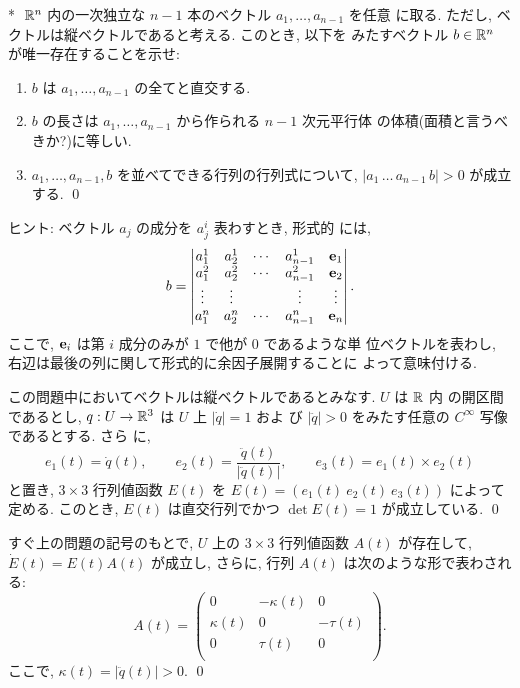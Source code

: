 \documentclass[12pt,twoside]{jarticle}
\def\qstar#1{$\!\!\!$#1$\;$}
\begin{document}
\begin{question}[ベクトル積の高次元への拡張]\qstar{*}
  ${\mathbb R}^n$ 内の一次独立な $n-1$ 本のベクトル $a_1,\dots,a_{n-1}$ を任意
  に取る. ただし, ベクトルは縦ベクトルであると考える. このとき, 以下を
  みたすベクトル $b \in {\mathbb R}^n$ が唯一存在することを示せ:
  \begin{enumerate}
  \item $b$ は $a_1,\dots,a_{n-1}$ の全てと直交する.
  \item $b$ の長さは $a_1,\dots,a_{n-1}$ から作られる $n-1$ 次元平行体
    の体積(面積と言うべきか?)に等しい.
  \item $a_1,\dots,a_{n-1}, b$ を並べてできる行列の行列式について,
    $|a_1 \, \dots \, a_{n-1} \, b| > 0$ が成立する. \qed
  \end{enumerate}
\end{question}

\noindent ヒント: ベクトル $a_j$ の成分を $a_j^{i}$ 表わすとき, 形式的
には, 
\[
  b
  =
  \begin{vmatrix}
    a_1^1  & a_2^1  & \cdots & a_{n-1}^1 & \bold{e}_1 \\
    a_1^2  & a_2^2  & \cdots & a_{n-1}^2 & \bold{e}_2 \\
    \vdots & \vdots &        & \vdots    & \vdots     \\
    a_1^n  & a_2^n  & \cdots & a_{n-1}^n & \bold{e}_n \\
  \end{vmatrix}.
\]
ここで, $\bold{e}_i$ は第 $i$ 成分のみが $1$ で他が $0$ であるような単
位ベクトルを表わし, 右辺は最後の列に関して形式的に余因子展開することに
よって意味付ける.

\begin{question}\label{q:FS1}
  この問題中においてベクトルは縦ベクトルであるとみなす. $U$ は ${\mathbb R}$ 内
  の開区間であるとし, $q : U \to {\mathbb R}^3$ は $U$ 上 $|\dot{q}| = 1$ およ
  び $|\ddot{q}| > 0$ をみたす任意の $C^\infty$ 写像であるとする. さら
  に, 
  \[
    e_1(t) = \dot{q}(t),
    \qquad
    e_2(t) = \frac{\ddot{q}(t)}{|\ddot{q}(t)|},
    \qquad
    e_3(t) = e_1(t) \times e_2(t)
  \]%
  と置き, $3\times 3$ 行列値函数 $E(t)$ を %
  $E(t) = (e_1(t)\ e_2(t)\ e_3(t))$ によって定める. このとき, $E(t)$ %
  は直交行列でかつ $\det E(t) = 1$ が成立している. \qed
\end{question}

\begin{question}\label{q:FS2}
  すぐ上の問題の記号のもとで, $U$ 上の $3 \times 3$ 行列値函数 $A(t)$ 
  が存在して, $\dot{E}(t) = E(t) A(t)$ が成立し, さらに, 行列 $A(t)$ 
  は次のような形で表わされる:
  \[
    A(t)
    =
    \begin{pmatrix}
          0     &  - \kappa(t) &    0      \\
       \kappa(t) &       0      & - \tau(t) \\
          0     &     \tau(t)  &    0      \\
    \end{pmatrix}.
  \]%
   ここで, $\kappa(t) = |\ddot{q}(t)| > 0$. \qed
\end{question}
\end{document}
